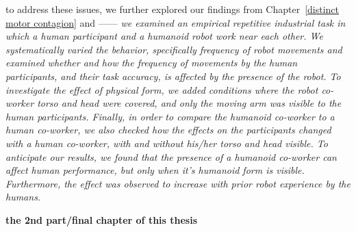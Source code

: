 to address these issues, we further explored our findings from Chapter~\ref{distinct motor contagion} and  ------
\textit{we examined an empirical repetitive industrial task in which a human participant and a humanoid robot work near each other. We systematically varied the behavior, specifically frequency of robot movements and examined whether and how the frequency of movements by the human participants, and their task accuracy, is affected by the presence of the robot. To investigate the effect of physical form, we added conditions where the robot co-worker torso and head were covered, and only the moving arm was visible to the human participants. Finally, in order to compare the humanoid co-worker to a human co-worker, we also checked how the effects on the participants changed with a human co-worker, with and without his/her torso and head visible. To anticipate our results, we found that the presence of a humanoid co-worker can affect human performance, but only when it's humanoid form is visible. Furthermore, the effect was observed to increase with prior robot experience by the humans.}



\textbf{the 2nd part/final chapter of this thesis}

\clearpage %
